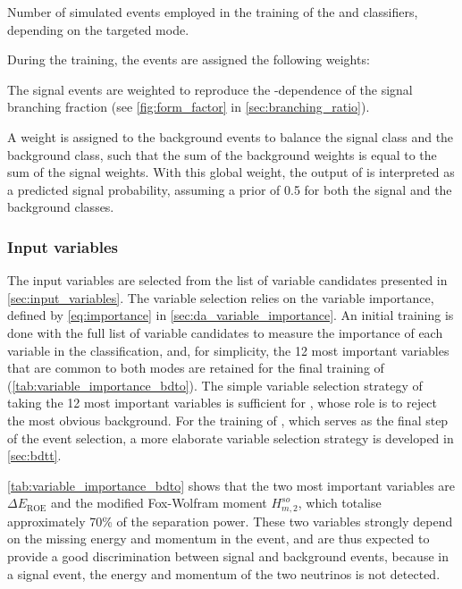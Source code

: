 {Number of simulated events employed in the training of the \bdto and \bdtt classifiers, depending on the targeted mode.}

During the training, the events are assigned the following weights:
\bi
\item The signal events are weighted to reproduce the \qq-dependence of the signal branching fraction (see \cref{fig:form_factor} in \cref{sec:branching_ratio}).
\item A weight is assigned to the background events to balance the signal class and the background class, such that the sum of the background weights is equal to the sum of the signal weights.
With this global weight, the output of \bdto is interpreted as a predicted signal probability, assuming a prior of 0.5 for both the signal and the background classes.
\ei
\subsubsection*{Input variables}
The \bdto input variables are selected from the list of variable candidates presented in \cref{sec:input_variables}.
The variable selection relies on the variable importance, defined by \cref{eq:importance} in \cref{sec:da_variable_importance}.
An initial training is done with the full list of variable candidates to measure the importance of each variable in the classification, and, for simplicity, the 12 most important variables that are common to both modes are retained for the final training of \bdto (\cref{tab:variable_importance_bdto}).
The simple variable selection strategy of taking the 12 most important variables is sufficient for \bdto, whose role is to reject the most obvious background.
For the training of \bdtt, which serves as the final step of the event selection, a more elaborate variable selection strategy is developed in \cref{sec:bdtt}.

\cref{tab:variable_importance_bdto} shows that the two most important variables are $\Delta E_{\mathrm{ROE}}$ and the modified Fox-Wolfram moment $H^{so}_{m,2}$, which totalise approximately 70\% of the separation power.
These two variables strongly depend on the missing energy and momentum in the event, and are thus expected to provide a good discrimination between signal and background events, because in a signal event, the energy and momentum of the two neutrinos is not detected.

